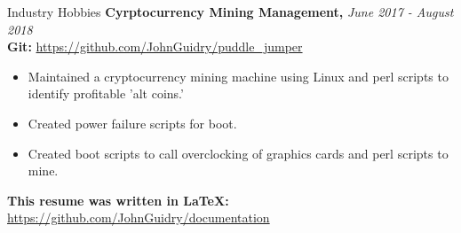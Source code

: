 \documentclass{resume} %
\begin{document}

\begin{rSection}{Industry Hobbies} 
{\bf Cyrptocurrency Mining Management, }{\em June 2017 - August 2018} 
\\
{\bf Git: }\url {https://github.com/JohnGuidry/puddle_jumper}
\begin{itemize}
\item Maintained a cryptocurrency mining machine using Linux and perl scripts to identify profitable 'alt coins.'
\item Created power failure scripts for boot.
\item Created boot scripts to call overclocking of graphics cards and perl scripts to mine.
\end{itemize}

{\bf This resume was written in LaTeX: }\url{https://github.com/JohnGuidry/documentation}
\end{rSection}
\end{document}
